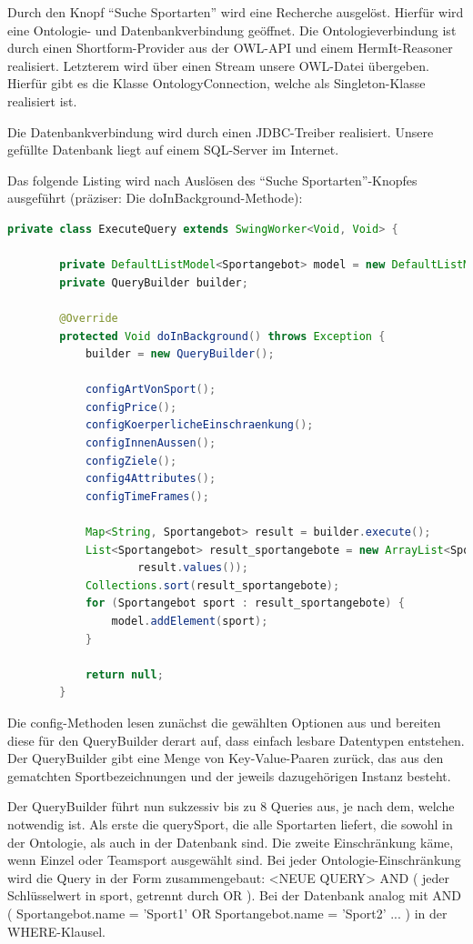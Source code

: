 Durch den Knopf "`Suche Sportarten"' wird eine Recherche ausgelöst. Hierfür wird eine Ontologie- und Datenbankverbindung geöffnet.
Die Ontologieverbindung ist durch einen Shortform-Provider aus der OWL-API und einem HermIt-Reasoner realisiert. Letzterem wird über einen Stream unsere OWL-Datei übergeben. Hierfür gibt es die Klasse OntologyConnection, welche als Singleton-Klasse realisiert ist.

Die Datenbankverbindung wird durch einen JDBC-Treiber realisiert. Unsere gefüllte Datenbank liegt auf einem SQL-Server im Internet.

Das folgende Listing wird nach Auslösen des "`Suche Sportarten"'-Knopfes ausgeführt (präziser: Die doInBackground-Methode):


\begin{lstlisting}[language=JAVA]
	private class ExecuteQuery extends SwingWorker<Void, Void> {

		private DefaultListModel<Sportangebot> model = new DefaultListModel<Sportangebot>();
		private QueryBuilder builder;

		@Override
		protected Void doInBackground() throws Exception {
			builder = new QueryBuilder();

			configArtVonSport();
			configPrice();
			configKoerperlicheEinschraenkung();
			configInnenAussen();
			configZiele();
			config4Attributes();
			configTimeFrames();

			Map<String, Sportangebot> result = builder.execute();
			List<Sportangebot> result_sportangebote = new ArrayList<Sportangebot>(
					result.values());
			Collections.sort(result_sportangebote);
			for (Sportangebot sport : result_sportangebote) {
				model.addElement(sport);
			}

			return null;
		}
\end{lstlisting}

Die config-Methoden lesen zunächst die gewählten Optionen aus und bereiten diese für den QueryBuilder derart auf, dass einfach lesbare Datentypen entstehen. Der QueryBuilder gibt eine Menge von Key-Value-Paaren zurück, das aus den gematchten Sportbezeichnungen und der jeweils dazugehörigen Instanz besteht.

Der QueryBuilder führt nun sukzessiv bis zu 8 Queries aus, je nach dem, welche notwendig ist. Als erste die querySport, die alle Sportarten liefert, die sowohl in der Ontologie, als auch in der Datenbank sind. Die zweite Einschränkung käme, wenn Einzel oder Teamsport ausgewählt sind. Bei jeder Ontologie-Einschränkung wird die Query in der Form zusammengebaut: <NEUE QUERY> AND ( jeder Schlüsselwert in sport, getrennt durch OR ). Bei der Datenbank analog mit AND ( Sportangebot.name = 'Sport1' OR Sportangebot.name = 'Sport2' ... ) in der WHERE-Klausel.

